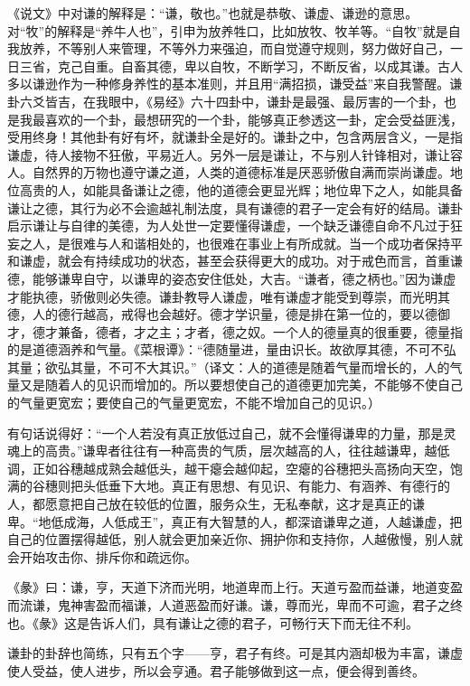 《说文》中对谦的解释是：“谦，敬也。”也就是恭敬、谦虚、谦逊的意思。对“牧”的解释是“养牛人也”，引申为放养牲口，比如放牧、牧羊等。“自牧”就是自我放养，不等别人来管理，不等外力来强迫，而自觉遵守规则，努力做好自己，一日三省，克己自重。自畜其德，卑以自牧，不断学习，不断反省，以成其谦。古人多以谦逊作为一种修身养性的基本准则，并且用“满招损，谦受益”来自我警醒。谦卦六爻皆吉，在我眼中，《易经》六十四卦中，谦卦是最强、最厉害的一个卦，也是我最喜欢的一个卦，最想研究的一个卦，能够真正参透这一卦，定会受益匪浅，受用终身！其他卦有好有坏，就谦卦全是好的。谦卦之中，包含两层含义，一是指谦虚，待人接物不狂傲，平易近人。另外一层是谦让，不与别人针锋相对，谦让容人。自然界的万物也遵守谦之道，人类的道德标准是厌恶骄傲自满而崇尚谦虚。地位高贵的人，如能具备谦让之德，他的道德会更显光辉；地位卑下之人，如能具备谦让之德，其行为必不会逾越礼制法度，具有谦德的君子一定会有好的结局。谦卦启示谦让与自律的美德，为人处世一定要懂得谦虚，一个缺乏谦德自命不凡过于狂妄之人，是很难与人和谐相处的，也很难在事业上有所成就。当一个成功者保持平和谦虚，就会有持续成功的状态，甚至会获得更大的成功。对于戒色而言，首重谦德，能够谦卑自守，以谦卑的姿态安住低处，大吉。“谦者，德之柄也。”因为谦虚才能执德，骄傲则必失德。谦卦教导人谦虚，唯有谦虚才能受到尊崇，而光明其德，人的德行越高，戒得也会越好。德才学识量，德是排在第一位的，要以德御才，德才兼备，德者，才之主；才者，德之奴。一个人的德量真的很重要，德量指的是道德涵养和气量。《菜根谭》：“德随量进，量由识长。故欲厚其德，不可不弘其量；欲弘其量，不可不大其识。”（译文：人的道德是随着气量而增长的，人的气量又是随着人的见识而增加的。所以要想使自己的道德更加完美，不能够不使自己的气量更宽宏；要使自己的气量更宽宏，不能不增加自己的见识。）

有句话说得好：“一个人若没有真正放低过自己，就不会懂得谦卑的力量，那是灵魂上的高贵。”谦卑者往往有一种高贵的气质，层次越高的人，往往越谦卑，越低调，正如谷穗越成熟会越低头，越干瘪会越仰起，空瘪的谷穗把头高扬向天空，饱满的谷穗则把头低垂下大地。真正有思想、有见识、有能力、有涵养、有德行的人，都愿意把自己放在较低的位置，服务众生，无私奉献，这才是真正的谦卑。“地低成海，人低成王”，真正有大智慧的人，都深谙谦卑之道，人越谦虚，把自己的位置摆得越低，别人就会更加亲近你、拥护你和支持你，人越傲慢，别人就会开始攻击你、排斥你和疏远你。

《彖》曰：谦，亨，天道下济而光明，地道卑而上行。天道亏盈而益谦，地道变盈而流谦，鬼神害盈而福谦，人道恶盈而好谦。谦，尊而光，卑而不可逾，君子之终也。《彖》这是告诉人们，具有谦让之德的君子，可畅行天下而无往不利。

谦卦的卦辞也简练，只有五个字——亨，君子有终。可是其内涵却极为丰富，谦虚使人受益，使人进步，所以会亨通。君子能够做到这一点，便会得到善终。

